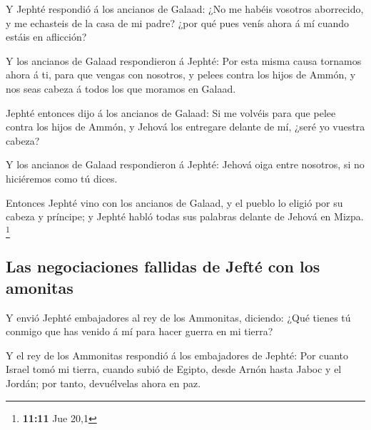  Y Jephté respondió á los ancianos de Galaad: ¿No me habéis
vosotros aborrecido, y me echasteis de la casa de mi padre? ¿por qué
pues venís ahora á mí cuando estáis en aflicción?

 Y los ancianos de Galaad respondieron á Jephté: Por esta
misma causa tornamos ahora á ti, para que vengas con nosotros, y pelees
contra los hijos de Ammón, y nos seas cabeza á todos los que moramos en
Galaad.

 Jephté entonces dijo á los ancianos de Galaad: Si me
volvéis para que pelee contra los hijos de Ammón, y Jehová los entregare
delante de mí, ¿seré yo vuestra cabeza?

 Y los ancianos de Galaad respondieron á Jephté: Jehová
oiga entre nosotros, si no hiciéremos como tú dices.

 Entonces Jephté vino con los ancianos de Galaad, y el
pueblo lo eligió por su cabeza y príncipe; y Jephté habló todas sus
palabras delante de Jehová en Mizpa. \footnote{\textbf{11:11} Jue 20,1}

\hypertarget{las-negociaciones-fallidas-de-jeftuxe9-con-los-amonitas}{%
\subsection{Las negociaciones fallidas de Jefté con los
amonitas}\label{las-negociaciones-fallidas-de-jeftuxe9-con-los-amonitas}}

 Y envió Jephté embajadores al rey de los Ammonitas,
diciendo: ¿Qué tienes tú conmigo que has venido á mí para hacer guerra
en mi tierra?

 Y el rey de los Ammonitas respondió á los embajadores de
Jephté: Por cuanto Israel tomó mi tierra, cuando subió de Egipto, desde
Arnón hasta Jaboc y el Jordán; por tanto, devuélvelas ahora en paz.

